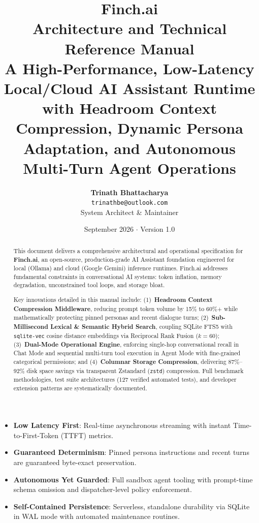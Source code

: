 \documentclass[11pt,a4paper,oneside]{report}
\title{
    \vspace{-1.5cm}
    {\huge\textbf{\color{brandblue}Finch.ai}}\\[0.4cm]
    {\Large\textbf{Architecture and Technical Reference Manual}}\\[0.3cm]
    {\normalsize\textsf{A High-Performance, Low-Latency Local/Cloud AI Assistant Runtime with Headroom Context Compression, Dynamic Persona Adaptation, and Autonomous Multi-Turn Agent Operations}}
}
\author{
    \textbf{Trinath Bhattacharya}\\
    \texttt{trinathbe@outlook.com}\\
    \small System Architect \& Maintainer
}
\date{September 2026 $\cdot$ Version 1.0}
\begin{document}
\maketitle
\thispagestyle{empty}

\begin{abstract}
\noindent This document delivers a comprehensive architectural and operational specification for \textbf{Finch.ai}, an open-source, production-grade AI Assistant foundation engineered for local (Ollama) and cloud (Google Gemini) inference runtimes. Finch.ai addresses fundamental constraints in conversational AI systems: token inflation, memory degradation, unconstrained tool loops, and storage bloat. 

Key innovations detailed in this manual include: (1)~\textbf{Headroom Context Compression Middleware}, reducing prompt token volume by 15\% to 60\%+ while mathematically protecting pinned personas and recent dialogue turns; (2)~\textbf{Sub-Millisecond Lexical \& Semantic Hybrid Search}, coupling SQLite FTS5 with \texttt{sqlite-vec} cosine distance embeddings via Reciprocal Rank Fusion ($k=60$); (3)~\textbf{Dual-Mode Operational Engine}, enforcing single-hop conversational recall in Chat Mode and sequential multi-turn tool execution in Agent Mode with fine-grained categorical permissions; and (4)~\textbf{Columnar Storage Compression}, delivering 87\%--92\% disk space savings via transparent Zstandard (\texttt{zstd}) compression. Full benchmark methodologies, test suite architectures (127 verified automated tests), and developer extension patterns are systematically documented.
\end{abstract}

\vspace{1cm}
\begin{infobox}
\begin{itemize}[leftmargin=1.5em]
    \item \textbf{Low Latency First}: Real-time asynchronous streaming with instant Time-to-First-Token (TTFT) metrics.
    \item \textbf{Guaranteed Determinism}: Pinned persona instructions and recent turns are guaranteed byte-exact preservation.
    \item \textbf{Autonomous Yet Guarded}: Full sandbox agent tooling with prompt-time schema omission and dispatcher-level policy enforcement.
    \item \textbf{Self-Contained Persistence}: Serverless, standalone durability via SQLite in WAL mode with automated maintenance routines.
\end{itemize}
\end{infobox}
\end{document}
